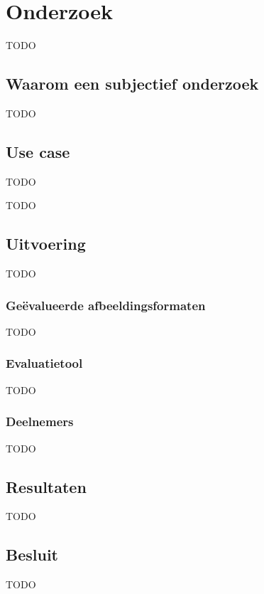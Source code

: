 \chapter{Onderzoek}
\label{ch:onderzoek}

TODO


\section{Waarom een subjectief onderzoek}
\label{sec:onderzoek-waarom-subjectief}

TODO

\section{Use case}
\label{sec:onderzoek-use-case}

TODO

TODO

\section{Uitvoering}
\label{sec:onderzoek-uitvoering}

TODO

\subsection{Geëvalueerde afbeeldingsformaten}
\label{sec:onderzoek-afbeeldingsformaten}

TODO

\subsection{Evaluatietool}
\label{sec:onderzoek-evaluatietool}

TODO

\subsection{Deelnemers}
\label{sec:onderzoek-deelnemers}

TODO

\section{Resultaten}
\label{sec:onderzoek-resultaten}

TODO

\section{Besluit}
\label{sec:onderzoek-besluit}

TODO
